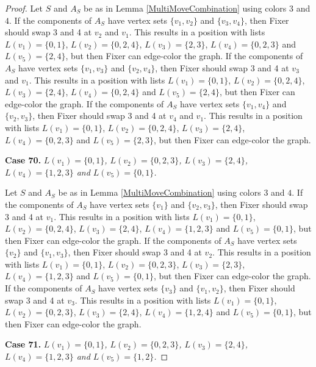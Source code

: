 \documentclass[12pt]{amsart}
\theoremstyle{plain}
\theoremstyle{definition}
\theoremstyle{remark}
\begin{document}
\begin{proof}
Let $S$ and $A_S$ be as in Lemma \ref{MultiMoveCombination} using colors $3$ and $4$. If the components of $A_S$ have vertex sets $\{v_1, v_2\}$ and $\{v_3, v_4\}$, then Fixer should swap 3 and 4 at $v_2$ and $v_1$. This results in a position with lists $L(v_1) = \{0, 1\}$, $L(v_2) = \{0, 2, 4\}$, $L(v_3) = \{2, 3\}$, $L(v_4) = \{0, 2, 3\}$ and $L(v_5) = \{2, 4\}$, but then Fixer can edge-color the graph.
If the components of $A_S$ have vertex sets $\{v_1, v_3\}$ and $\{v_2, v_4\}$, then Fixer should swap 3 and 4 at $v_3$ and $v_1$. This results in a position with lists $L(v_1) = \{0, 1\}$, $L(v_2) = \{0, 2, 4\}$, $L(v_3) = \{2, 4\}$, $L(v_4) = \{0, 2, 4\}$ and $L(v_5) = \{2, 4\}$, but then Fixer can edge-color the graph.
If the components of $A_S$ have vertex sets $\{v_1, v_4\}$ and $\{v_2, v_3\}$, then Fixer should swap 3 and 4 at $v_4$ and $v_1$. This results in a position with lists $L(v_1) = \{0, 1\}$, $L(v_2) = \{0, 2, 4\}$, $L(v_3) = \{2, 4\}$, $L(v_4) = \{0, 2, 3\}$ and $L(v_5) = \{2, 3\}$, but then Fixer can edge-color the graph.

\noindent\textbf{Case 70.  }\textit{$L(v_1) = \{0, 1\}$, $L(v_2) = \{0, 2, 3\}$, $L(v_3) = \{2, 4\}$, $L(v_4) = \{1, 2, 3\}$ and $L(v_5) = \{0, 1\}$.}

Let $S$ and $A_S$ be as in Lemma \ref{MultiMoveCombination} using colors $3$ and $4$. If the components of $A_S$ have vertex sets $\{v_1\}$ and $\{v_2, v_3\}$, then Fixer should swap 3 and 4 at $v_1$. This results in a position with lists $L(v_1) = \{0, 1\}$, $L(v_2) = \{0, 2, 4\}$, $L(v_3) = \{2, 4\}$, $L(v_4) = \{1, 2, 3\}$ and $L(v_5) = \{0, 1\}$, but then Fixer can edge-color the graph.
If the components of $A_S$ have vertex sets $\{v_2\}$ and $\{v_1, v_3\}$, then Fixer should swap 3 and 4 at $v_2$. This results in a position with lists $L(v_1) = \{0, 1\}$, $L(v_2) = \{0, 2, 3\}$, $L(v_3) = \{2, 3\}$, $L(v_4) = \{1, 2, 3\}$ and $L(v_5) = \{0, 1\}$, but then Fixer can edge-color the graph.
If the components of $A_S$ have vertex sets $\{v_3\}$ and $\{v_1, v_2\}$, then Fixer should swap 3 and 4 at $v_3$. This results in a position with lists $L(v_1) = \{0, 1\}$, $L(v_2) = \{0, 2, 3\}$, $L(v_3) = \{2, 4\}$, $L(v_4) = \{1, 2, 4\}$ and $L(v_5) = \{0, 1\}$, but then Fixer can edge-color the graph.

\noindent\textbf{Case 71.  }\textit{$L(v_1) = \{0, 1\}$, $L(v_2) = \{0, 2, 3\}$, $L(v_3) = \{2, 4\}$, $L(v_4) = \{1, 2, 3\}$ and $L(v_5) = \{1, 2\}$.}


\end{proof}
\end{document}
